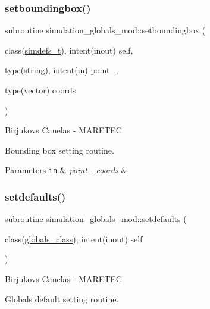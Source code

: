 \subsubsection{\texorpdfstring{setboundingbox()}{setboundingbox()}}
{\footnotesize\ttfamily subroutine simulation\+\_\+globals\+\_\+mod\+::setboundingbox (\begin{DoxyParamCaption}\item[{class(\hyperlink{structsimulation__globals__mod_1_1simdefs__t}{simdefs\+\_\+t}), intent(inout)}]{self,  }\item[{type(string), intent(in)}]{point\+\_\+,  }\item[{type(vector)}]{coords }\end{DoxyParamCaption})\hspace{0.3cm}{\ttfamily [private]}}



Birjukovs Canelas -\/ M\+A\+R\+E\+T\+EC 

Bounding box setting routine. 
\begin{DoxyParams}[1]{Parameters}
\mbox{\tt in}  & {\em point\+\_\+,coords} & \\
\hline
\end{DoxyParams}
\mbox{\label{namespacesimulation__globals__mod_ac2ac06271de377004c67b6ba2f3ed353}} 
\subsubsection{\texorpdfstring{setdefaults()}{setdefaults()}}
{\footnotesize\ttfamily subroutine simulation\+\_\+globals\+\_\+mod\+::setdefaults (\begin{DoxyParamCaption}\item[{class(\hyperlink{structsimulation__globals__mod_1_1globals__class}{globals\+\_\+class}), intent(inout)}]{self }\end{DoxyParamCaption})\hspace{0.3cm}{\ttfamily [private]}}



Birjukovs Canelas -\/ M\+A\+R\+E\+T\+EC 

Globals default setting routine. \mbox{\label{namespacesimulation__globals__mod_acb8e3762572266b40a0deb166dded33a}} 
